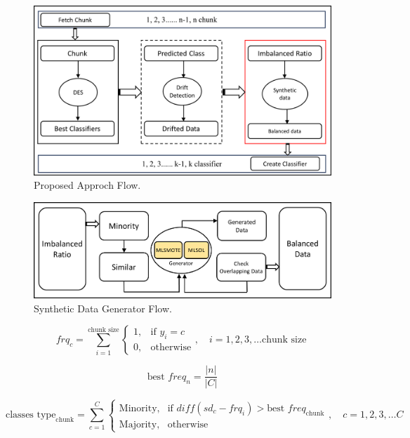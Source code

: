\begin{figure}[!ht]
	\centering
	\includegraphics[width=1\linewidth]{4_Taxonomy/figures/approach_step_1.png}
	\caption{Proposed Approch Flow.}
	\label{fig:4_first_proposal_step_1}
\end{figure}
\begin{figure}[!ht]
	\centering
	\includegraphics[width=1\linewidth]{4_Taxonomy/figures/approach_step_2.png}
	\caption{Synthetic Data Generator Flow.}
	\label{fig:4_first_proposal_step_2}
\end{figure}

\begin{equation}
	\label{eq:4_first_proposal_1}
    frq_{c} = \sum_{i=1}^{\text{chunk size}} \begin{cases} 
    1, & \text{if } y_i = c \\
    0, & \text{otherwise}
    \end{cases}, \quad i = 1, 2, 3, \dots \text{chunk size}\;
\end{equation}

\begin{equation}
	\label{eq:4_first_proposal_2}
    \text{best } freq_{n} = \frac{|n|}{|C|}
\end{equation}

\begin{equation}
	\label{eq:4_first_proposal_3}
    \text{classes type}_{\text{chunk}} = \sum_{c=1}^{C} \begin{cases} 
    \text{Minority,} & \text{if } diff(sd_c - frq_i) > \text{best } freq_{\text{chunk}} \\
    \text{Majority,} & \text{otherwise}
    \end{cases}, \quad c = 1, 2, 3, \dots C
\end{equation}



